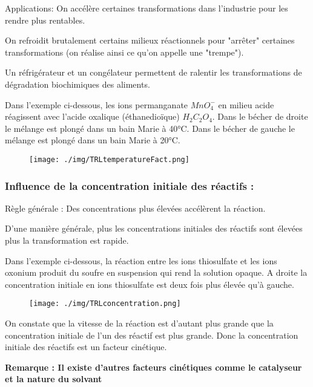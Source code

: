 \documentclass[12pt]{article}
\begin{document}
Applications:	On accélère certaines transformations dans l'industrie pour les rendre plus rentables.

On refroidit brutalement certains milieux réactionnels pour "arrêter" certaines transformations (on réalise ainsi ce qu'on appelle une "trempe").

Un réfrigérateur et un congélateur permettent de ralentir les transformations de dégradation biochimiques des aliments.

Dans l'exemple ci-dessous, les ions permanganate $MnO_4^-$ en milieu acide réagissent avec l'acide oxalique 
 (éthanedioïque) $H_2C_2O_4$. Dans le bécher de droite le mélange est plongé dans un bain Marie à 40°C. Dans le bécher de gauche le mélange est plongé dans un bain Marie à 20°C.
\begin{figure}[h!]
	\begin{center}
	\texttt{[image: ./img/TRLtemperatureFact.png]}
\end{center}
\vspace{-1cm}
\end{figure}

\subsubsection{Influence de la concentration initiale des réactifs :}
Règle générale : Des concentrations plus élevées accélèrent la réaction.

D'une manière générale, plus les concentrations initiales des réactifs sont élevées plus la transformation est rapide.

Dans l'exemple ci-dessous, la réaction entre les ions thiosulfate et les ions oxonium produit du soufre en suspension qui rend la solution opaque. A droite la concentration initiale en ions thiosulfate est deux fois plus élevée qu'à gauche.
\begin{figure}[h!]
	\begin{center}
	\texttt{[image: ./img/TRLconcentration.png]}
\end{center}
\vspace{-1cm}
\end{figure}

On constate que la vitesse de la réaction est d'autant plus grande que la concentration initiale de l'un des réactif est plus grande.
Donc la concentration initiale des réactifs est un facteur cinétique.

\textbf{Remarque : Il existe d'autres facteurs cinétiques comme le catalyseur et la nature du solvant}
\end{document}

